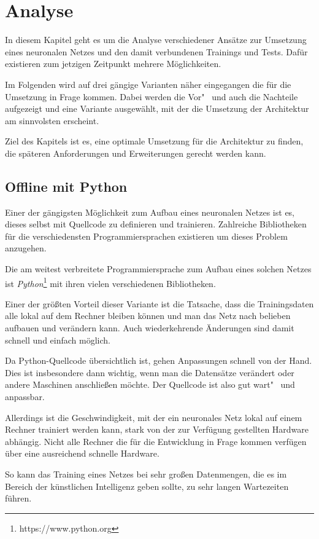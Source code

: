 \section{Analyse}
\label{sec:analyse}
In diesem Kapitel geht es um die Analyse verschiedener Ansätze zur Umsetzung eines neuronalen Netzes und den damit
verbundenen Trainings und Tests. Dafür existieren zum jetzigen Zeitpunkt mehrere Möglichkeiten.

Im Folgenden wird auf drei gängige Varianten näher eingegangen die für die Umsetzung in Frage kommen. Dabei werden die
Vor"~ und auch die Nachteile aufgezeigt und eine Variante ausgewählt, mit der die Umsetzung der Architektur am
sinnvolsten erscheint.

Ziel des Kapitels ist es, eine optimale Umsetzung für die Architektur zu finden, die späteren Anforderungen und
Erweiterungen gerecht werden kann.

\subsection{Offline mit Python}
Einer der gängigsten Möglichkeit zum Aufbau eines neuronalen Netzes ist es, dieses selbst mit Quellcode zu definieren
und trainieren. Zahlreiche Bibliotheken für die verschiedensten Programmiersprachen existieren um dieses Problem
anzugehen.

Die am weitest verbreitete Programmiersprache zum Aufbau eines solchen Netzes ist
\textit{Python}\footnote{https://www.python.org} mit ihren vielen verschiedenen Bibliotheken.

Einer der größten Vorteil dieser Variante ist die Tatsache, dass die Trainingsdaten alle lokal auf dem Rechner bleiben
können und man das Netz nach belieben aufbauen und verändern kann. Auch wiederkehrende Änderungen sind damit schnell und
einfach möglich.

Da Python-Quellcode übersichtlich ist, gehen Anpassungen schnell von der Hand. Dies ist insbesondere dann wichtig, wenn
man die Datensätze verändert oder andere Maschinen anschließen möchte. Der Quellcode ist also gut wart"~ und anpassbar.

Allerdings ist die Geschwindigkeit, mit der ein neuronales Netz lokal auf einem Rechner trainiert werden kann, stark
von der zur Verfügung gestellten Hardware abhängig. Nicht alle Rechner die für die Entwicklung in Frage kommen verfügen
über eine ausreichend schnelle Hardware.

So kann das Training eines Netzes bei sehr großen Datenmengen, die es im Bereich der künstlichen Intelligenz geben
sollte, zu sehr langen Wartezeiten führen.

